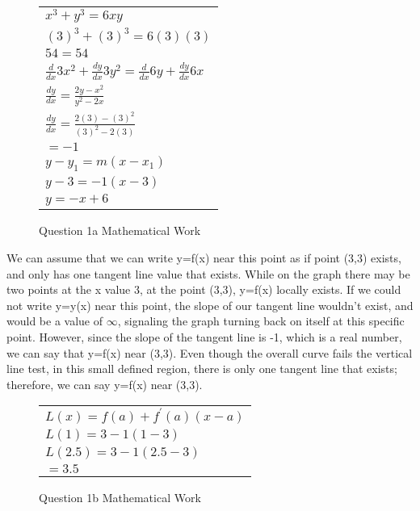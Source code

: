 \documentclass[answers,addpoints]{exam}
\begin{document}
\begin{questions}
  \question \
  \begin{solution}

    \begin{figure}[H]
      \centering
      \begin{tabular}{@{}l@{}}
        $\displaystyle x^3+y^3=6xy$ \\[6pt]
        $\displaystyle (3)^3+(3)^3=6(3)(3)$ \\[6pt]
        $\displaystyle 54=54$ \\[12pt]
        $\displaystyle \frac{d}{dx}3x^2+\frac{dy}{dx}3y^2=\frac{d}{dx}6y+\frac{dy}{dx}6x$ \\[6pt]
        $\displaystyle \frac{dy}{dx}=\frac{2y-x^2}{y^2-2x}$ \\[6pt]
        $\displaystyle \frac{dy}{dx}=\frac{2(3)-(3)^2}{(3)^2-2(3)}$ \\[6pt]
        $\displaystyle =-1$ \\[12pt]
        $\displaystyle y-y_{1}=m(x-x_{1})$ \\[6pt]
        $\displaystyle y-3=-1(x-3)$ \\[6pt]
        $\displaystyle y=-x+6$ \\[6pt]
      \end{tabular}
      \caption{Question 1a Mathematical Work}
      \label{fig:1a-math}
    \end{figure}


    We can assume that we can write y=f(x) near this point as if point (3,3) exists, and only has one tangent line value that exists. While on the graph there may be two points at the x value 3, at the point (3,3), y=f(x) locally exists. If we could not write y=y(x) near this point, the slope of our tangent line wouldn't exist, and would be a value of $\infty$, signaling the graph turning back on itself at this specific point. However, since the slope of the tangent line is -1, which is a real number, we can say that y=f(x) near (3,3). Even though the overall curve fails the vertical line test, in this small defined region, there is only one tangent line that exists; therefore, we can say y=f(x) near (3,3).

    \begin{figure}[H]
      \centering
      \begin{tabular}{@{}l@{}}
        $\displaystyle L(x)=f(a)+f^\prime(a)(x-a)$ \\[6pt]
        $\displaystyle L(1)=3-1(1-3)$ \\[6pt]
        $\displaystyle L(2.5)=3-1(2.5-3)$ \\[6pt]
        $\displaystyle =3.5$ \\[6pt]
      \end{tabular}
      \caption{Question 1b Mathematical Work}
      \label{fig:1b-math}
    \end{figure}


\end{solution}
\end{questions}
\end{document}
